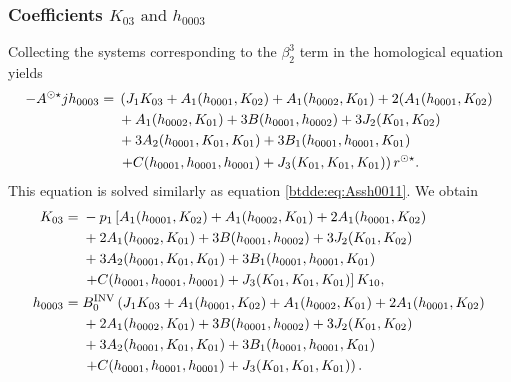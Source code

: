 \subsubsection{Coefficients \texorpdfstring{$K_{03} \text{ and } h_{0003}$}{K03
				and h0003}}
\label{btdde:subsubsection:K03_h0003}

Collecting the systems corresponding to the $\beta_2^3$ term in the
homological equation yields
\begin{equation*}
\begin{aligned}
-A^{\odot\star} jh_{0003} ={}& \left( J_1 K_{03} + A_1(h_{0001},K_{02}) + A_1(h_{0002},K_{01})
				+ 2 (A_1(h_{0001},K_{02}) \right. \\
				& + A_1(h_{0002},K_{01}) + 3 B(h_{0001},h_{0002}) + 3 J_2(K_{01},K_{02}) \\
				& + 3 A_2(h_{0001},K_{01},K_{01}) + 3 B_1(h_{0001},h_{0001},K_{01}) \\
				& \left. + C(h_{0001},h_{0001},h_{0001}) + J_3(K_{01},K_{01},K_{01}) \right)r^{\odot\star}.
\end{aligned}
\end{equation*}
This equation is solved similarly as equation \cref{btdde:eq:Assh0011}. We obtain
\begin{equation*}
\begin{aligned}
K_{03}={}& -p_1 \left[ A_1(h_{0001},K_{02}) + A_1(h_{0002},K_{01})
				+ 2 A_1(h_{0001},K_{02}) \right. \\
				& + 2 A_1(h_{0002},K_{01}) + 3 B(h_{0001},h_{0002}) + 3 J_2(K_{01},K_{02}) \\
				& + 3 A_2(h_{0001},K_{01},K_{01}) + 3 B_1(h_{0001},h_{0001},K_{01}) \\
				& \left. + C(h_{0001},h_{0001},h_{0001}) +
				J_3(K_{01},K_{01},K_{01}) \right] K_{10}, \\
h_{0003} ={}& B^{\mathrm{INV}}_{0} \left( J_1 K_{03} + A_1(h_{0001},K_{02}) +
				A_1(h_{0002},K_{01}) + 2 A_1(h_{0001},K_{02}) \right. \\
				& + 2 A_1(h_{0002},K_{01}) + 3 B(h_{0001},h_{0002}) + 3 J_2(K_{01},K_{02}) \\
				& + 3 A_2(h_{0001},K_{01},K_{01}) + 3 B_1(h_{0001},h_{0001},K_{01}) \\
				& \left. + C(h_{0001},h_{0001},h_{0001}) +
				J_3(K_{01},K_{01},K_{01})\right).
\end{aligned}
\end{equation*}

